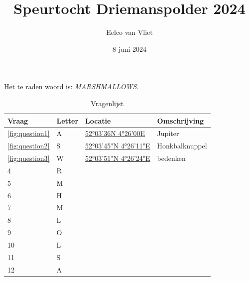 \documentclass{article}
\title{Speurtocht Driemanspolder 2024}
\author{Eelco van Vliet}
\date{8 juni 2024}
\begin{document}
    \maketitle

    Het te raden woord is: \emph{MARSHMALLOWS}.

    \begin{table}
        \caption{Vragenlijst}
        \begin{tabular}{llll}
            \toprule
            \textbf{Vraag} & \textbf{Letter} & \textbf{Locatie} & \textbf{Omschrijving} \\
            \midrule
            \ref{fig:question1} & A &
            \href{https://forms.gle/88Jf8wcjFSU8aojt8}{52°03'36N 4°26'00E} & Jupiter\\
            \ref{fig:question2} & S &
            \href{https://forms.gle/jwE6WMcVdYzMEdi86}{52°03'45"N 4°26'11"E} & Honkbalknuppel\\
            \ref{fig:question3} & W &
            \href{https://forms.gle/jwE6WMcVdYzMEdi86}{52°03'51"N 4°26'24"E} & bedenken \\
            4                    & R               &                  &                       \\
            5                    & M               &                  &                       \\
            6                    & H               &                  &                       \\
            7                    & M               &                  &                       \\
            8                    & L               &                  &                       \\
            9                    & O               &                  &                       \\
            10                   & L               &                  &                       \\
            11                   & S               &                  &                       \\
            12                   & A               &                  &                       \\
            \bottomrule
        \end{tabular}\label{tab:table}
    \end{table}
\end{document}
